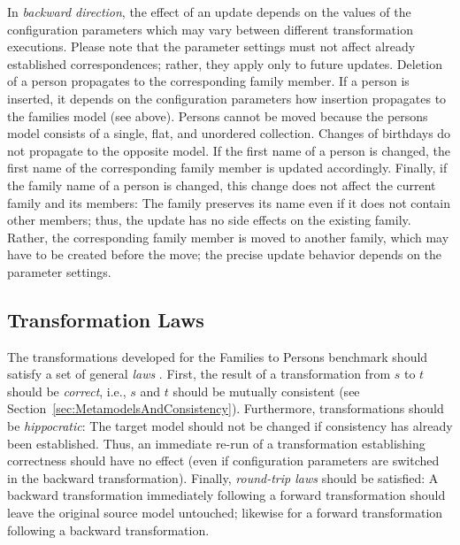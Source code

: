 In \emph{backward direction}, the effect of an update depends on the values of the configuration parameters which may vary between different transformation executions. Please note that the parameter settings must not affect already established correspondences; rather, they apply only to future updates. Deletion of a person propagates to the corresponding family member. If a person is inserted, it depends on the configuration parameters how insertion propagates to the families model (see above). Persons cannot be moved because the persons model consists of a single, flat, and unordered collection. Changes of birthdays do not propagate to the opposite model. If the first name of a person is changed, the first name of the corresponding family member is updated accordingly. Finally, if the family name of a person is changed, this change does not affect the current family and its members: The family preserves its name even if it does not contain other members; thus, the update has no side effects on the existing family. Rather, the corresponding family member is moved to another family, which may have to be created before the move; the precise update behavior depends on the parameter settings.

\subsection{Transformation Laws}
\label{sec:TranformationLaws}


\noindent The transformations developed for the Families to Persons benchmark should satisfy a set of general \emph{laws} \cite{SOSYM-Stevens2010}. First, the result of a transformation from $s$ to $t$ should be \emph{correct}, i.e., $s$ and $t$ should be mutually consistent (see Section~\ref{sec:MetamodelsAndConsistency}). Furthermore, transformations should be \emph{hippocratic}: The target model should not be changed if consistency has already been established. Thus, an immediate re-run of a transformation establishing correctness should have no effect (even if configuration parameters are switched in the backward transformation). Finally, \emph{round-trip laws} \cite{TOPLAS2007-Foster} should be satisfied: A backward transformation immediately following a forward transformation should leave the original source model untouched; likewise for a forward transformation following a backward transformation.

